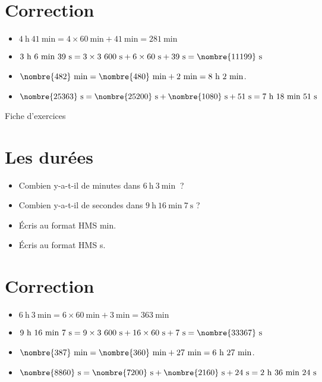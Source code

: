 \documentclass[a4paper,11pt,fleqn]{article}
\begin{document}
\section{Correction}
\begin{itemize}
 \item $4~\text{h}~41~\text{min}=4\times60~\text{min}+41~\text{min}=281~\text{min}$
  \item $3~\text{h}~6~\text{min}~39~\text{s}=3\times3~600~\text{s}+6\times60~\text{s}+39~\text{s}=\nombre{11199}~\text{s}$
  \item $\nombre{482}~\text{min}=\nombre{480}~\text{min}+2~\text{min}=8~\text{h}~2~\text{min}$.
  \item $\nombre{25363}~\text{s}=\nombre{25200}~\text{s}+\nombre{1080}~\text{s}+51~\text{s}=7~\text{h}~18~\text{min}~51~\text{s}$ \end{itemize}


\newpage
\setcounter{exo}{0}
\setcounter{section}{0}
\begin{center}
	{\huge Fiche d'exercices } 	
\end{center}


\section{Les durées}
\begin{itemize}
  \item Combien y-a-t-il de minutes dans $6~\text{h}~3~\text{min}~$ ?
  \item Combien y-a-t-il de secondes dans $9~\text{h}~16~\text{min}~7~\text{s}$ ?
  \item Écris au format HMS  min.
  \item Écris au format HMS  s.
\end{itemize}

\section{Correction}
\begin{itemize}
 \item $6~\text{h}~3~\text{min}=6\times60~\text{min}+3~\text{min}=363~\text{min}$
  \item $9~\text{h}~16~\text{min}~7~\text{s}=9\times3~600~\text{s}+16\times60~\text{s}+7~\text{s}=\nombre{33367}~\text{s}$
  \item $\nombre{387}~\text{min}=\nombre{360}~\text{min}+27~\text{min}=6~\text{h}~27~\text{min}$.
  \item $\nombre{8860}~\text{s}=\nombre{7200}~\text{s}+\nombre{2160}~\text{s}+24~\text{s}=2~\text{h}~36~\text{min}~24~\text{s}$ \end{itemize}
\end{document}
